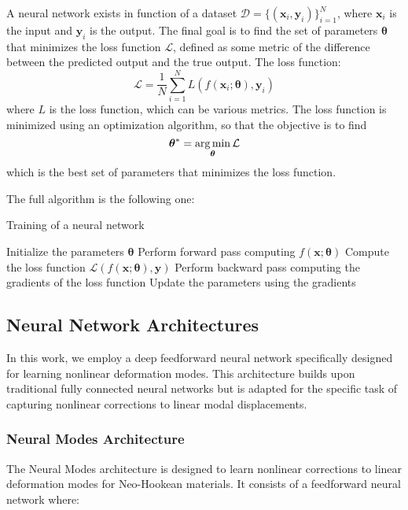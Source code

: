 A neural network exists in function of a dataset \( \mathcal{D} = \{(\bm{x}_i, \bm{y}_i)\}_{i=1}^N \), where \( \bm{x}_i \) is the input and \( \bm{y}_i \) is the output. The final goal is to find the set of parameters \( \bm{\theta} \) that minimizes the loss function \( \mathcal{L} \), defined as some metric of the difference between the predicted output and the true output. The loss function:
\begin{equation}
    \mathcal{L} = \frac{1}{N} \sum_{i=1}^N L(f(\bm{x}_i; \bm{\theta}), \bm{y}_i)
\end{equation}
where \( L \) is the loss function, which can be various metrics. The loss function is minimized using an optimization algorithm, so that the objective is to find
\begin{equation}
    \bm{\theta}^* = \operatorname*{arg\,min}_{\bm{\theta}} \mathcal{L}
\end{equation}
which is the best set of parameters that minimizes the loss function.

The full algorithm is the following one:
\begin{algorithm} 
    \caption{Training of a neural network}
    \begin{algorithmic}
        \State Initialize the parameters \( \bm{\theta} \)
                \State Perform forward pass computing \( f(\bm{x}; \bm{\theta}) \)
                \State Compute the loss function \( \mathcal{L}(f(\bm{x}; \bm{\theta}), \bm{y}) \)
                \State Perform backward pass computing the gradients of the loss function
                \State Update the parameters using the gradients
            \EndFor
        \EndWhile
    \end{algorithmic}
\end{algorithm}

\subsection{Neural Network Architectures}
In this work, we employ a deep feedforward neural network specifically designed for learning nonlinear deformation modes. This architecture builds upon traditional fully connected neural networks but is adapted for the specific task of capturing nonlinear corrections to linear modal displacements.

\subsubsection{Neural Modes Architecture}
The Neural Modes architecture is designed to learn nonlinear corrections to linear deformation modes for Neo-Hookean materials. It consists of a feedforward neural network where:

